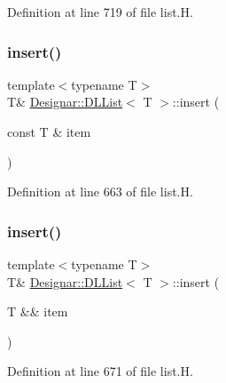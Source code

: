 Definition at line 719 of file list.\+H.

\mbox{\label{class_designar_1_1_d_l_list_ad153fdaa8982b2276266e1e0dbb8b773}} 
\subsubsection{\texorpdfstring{insert()}{insert()}\hspace{0.1cm}{\footnotesize\ttfamily [1/2]}}
{\footnotesize\ttfamily template$<$typename T$>$ \\
T\& \hyperlink{class_designar_1_1_d_l_list}{Designar\+::\+D\+L\+List}$<$ T $>$\+::insert (\begin{DoxyParamCaption}\item[{const T \&}]{item }\end{DoxyParamCaption})\hspace{0.3cm}{\ttfamily [inline]}}



Definition at line 663 of file list.\+H.

\mbox{\label{class_designar_1_1_d_l_list_a4a88465e07f8708eea591614b5822bb6}} 
\subsubsection{\texorpdfstring{insert()}{insert()}\hspace{0.1cm}{\footnotesize\ttfamily [2/2]}}
{\footnotesize\ttfamily template$<$typename T$>$ \\
T\& \hyperlink{class_designar_1_1_d_l_list}{Designar\+::\+D\+L\+List}$<$ T $>$\+::insert (\begin{DoxyParamCaption}\item[{T \&\&}]{item }\end{DoxyParamCaption})\hspace{0.3cm}{\ttfamily [inline]}}



Definition at line 671 of file list.\+H.

\mbox{\label{class_designar_1_1_d_l_list_a3fda59e4bde20b86ee0cc0f083fc5f3a}} 
